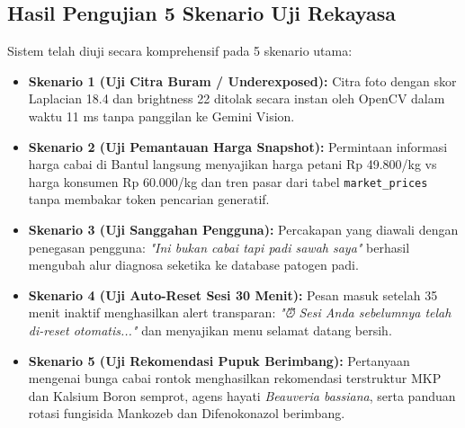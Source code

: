 \documentclass[11pt,a4paper]{article}
\begin{document}
\subsection{Hasil Pengujian 5 Skenario Uji Rekayasa}
Sistem telah diuji secara komprehensif pada 5 skenario utama:
\begin{itemize}
    \item \textbf{Skenario 1 (Uji Citra Buram / Underexposed):} Citra foto dengan skor Laplacian 18.4 dan brightness 22 ditolak secara instan oleh OpenCV dalam waktu 11 ms tanpa panggilan ke Gemini Vision.
    \item \textbf{Skenario 2 (Uji Pemantauan Harga Snapshot):} Permintaan informasi harga cabai di Bantul langsung menyajikan harga petani Rp 49.800/kg vs harga konsumen Rp 60.000/kg dan tren pasar dari tabel \texttt{market\_prices} tanpa membakar token pencarian generatif.
    \item \textbf{Skenario 3 (Uji Sanggahan Pengguna):} Percakapan yang diawali dengan penegasan pengguna: \textit{"Ini bukan cabai tapi padi sawah saya"} berhasil mengubah alur diagnosa seketika ke database patogen padi.
    \item \textbf{Skenario 4 (Uji Auto-Reset Sesi 30 Menit):} Pesan masuk setelah 35 menit inaktif menghasilkan alert transparan: \textit{"⏰ Sesi Anda sebelumnya telah di-reset otomatis..."} dan menyajikan menu selamat datang bersih.
    \item \textbf{Skenario 5 (Uji Rekomendasi Pupuk Berimbang):} Pertanyaan mengenai bunga cabai rontok menghasilkan rekomendasi terstruktur MKP dan Kalsium Boron semprot, agens hayati \textit{Beauveria bassiana}, serta panduan rotasi fungisida Mankozeb dan Difenokonazol berimbang.
\end{itemize}
\end{document}

